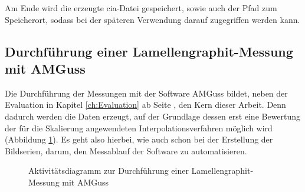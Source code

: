 \documentclass[
fontsize=10pt, 
listof = totoc,
parskip = half	
]{report}
\begin{document}
\noindent Am Ende wird die erzeugte cia-Datei gespeichert, sowie auch der Pfad zum Speicherort, sodass bei der späteren Verwendung darauf zugegriffen werden kann.

\subsection{Durchführung einer Lamellengraphit-Messung mit AMGuss}
\label{subsec:FlowLamellengussmessung}
Die Durchführung der Messungen mit der Software AMGuss bildet, neben der Evaluation in Kapitel \ref{ch:Evaluation} ab Seite \pageref{ch:Evaluation}, den Kern dieser Arbeit.  Denn dadurch werden die Daten erzeugt, auf der Grundlage dessen erst eine Bewertung der für die Skalierung angewendeten Interpolationsverfahren möglich wird (Abbildung \ref{fig:FlowLamellengussMessung}). Es geht also hierbei, wie auch schon bei der Erstellung der Bildserien, darum, den Messablauf der Software zu automatisieren.

\begin{figure}[H]
	\centering
	\caption{Aktivitätsdiagramm zur Durchführung einer Lamellengraphit-Messung mit AMGuss}
	\label{fig:FlowLamellengussMessung}
\end{figure}
\end{document}
